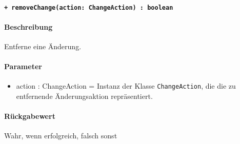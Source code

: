 \paragraph{\texttt{+ removeChange(action: ChangeAction) : boolean}}%
\paragraph*{Beschreibung}
Entferne eine Änderung.
\paragraph*{Parameter}
\begin{itemize}
    \item action : ChangeAction = Instanz der Klasse \verb#ChangeAction#, die die zu entfernende Änderungsaktion repräsentiert.
\end{itemize}
\paragraph*{Rückgabewert}
Wahr, wenn erfolgreich, falsch sonst
